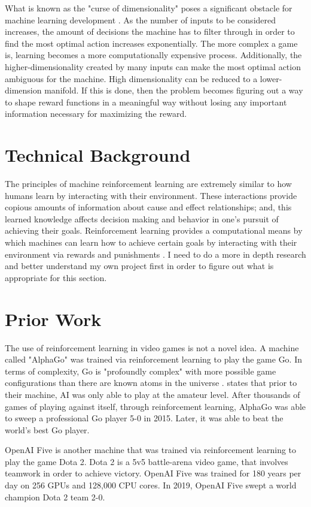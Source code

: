 \documentclass[10pt,twocolumn]{article}
\begin{document}
What is known as the "curse of dimensionality" poses a significant obstacle for machine learning development \cite{karanam_2021}. As the number of inputs to be considered increases, the amount of decisions the machine has to filter through in order to find the most optimal action increases exponentially. The more complex a game is, learning becomes a more computationally expensive process. Additionally, the higher-dimensionality created by many inputs can make the most optimal action ambiguous for the machine. High dimensionality can be reduced to a lower-dimension manifold. If this is done, then the problem becomes figuring out a way to shape reward functions in a meaningful way without losing any important information necessary for maximizing the reward.






\section{Technical Background}


The principles of machine reinforcement learning are extremely similar to how humans learn by interacting with their environment. These interactions provide copious amounts of information about cause and effect relationships; and, this learned knowledge affects decision making and behavior in one's pursuit of achieving their goals. Reinforcement learning provides a computational means by which machines can learn how to achieve certain goals by interacting with their environment via rewards and punishments \cite{Sutton1998}. I need to do a more in depth research and better understand my own project first in order to figure out what is appropriate for this section.




\section{Prior Work}
The use of reinforcement learning in video games is not a novel idea. A machine called "AlphaGo" was trained via reinforcement learning to play the game Go. In terms of complexity, Go is "profoundly complex" with more possible game configurations than there are known atoms in the universe \cite{deepmind}. \textcite{deepmind} states that prior to their machine, AI was only able to play at the amateur level. After thousands of games of playing against itself, through reinforcement learning, AlphaGo was able to sweep a professional Go player 5-0 in 2015. Later, it was able to beat the world's best Go player. 

OpenAI Five is another machine that was trained via reinforcement learning to play the game Dota 2\cite{OpenAI_dota}. Dota 2 is a 5v5 battle-arena video game, that involves teamwork in order to achieve victory. OpenAI Five was trained for 180 years per day on 256 GPUs and 128,000 CPU cores. In 2019, OpenAI Five swept a world champion Dota 2 team 2-0.




\printbibliography 
\end{document}
